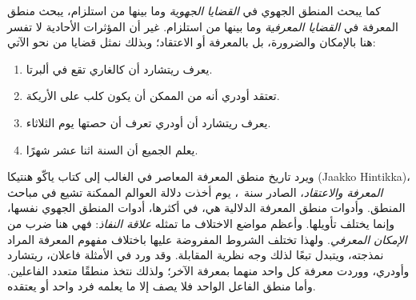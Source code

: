 \documentclass[../../../include/open-logic-section]{subfiles}
\begin{document}


كما يبحث المنطق الجهوي في \emph{القضايا الجهوية} وما بينها من استلزام، يبحث
منطق المعرفة في \emph{القضايا المعرفية} وما بينها من استلزام. غير أن
المؤثرات الأحادية لا تفسر هنا بالإمكان والضرورة، بل بالمعرفة أو الاعتقاد؛
وبذلك نمثل قضايا من نحو الآتي:

\begin{enumerate}
\item يعرف ريتشارد أن كالغاري تقع في ألبرتا.
\item تعتقد أودري أنه من الممكن أن يكون كلب على الأريكة.
\item يعرف ريتشارد أن أودري تعرف أن حصتها يوم الثلاثاء.
\item يعلم الجميع أن السنة اثنا عشر شهرًا.
\end{enumerate}
ويرد تاريخ منطق المعرفة المعاصر في الغالب إلى كتاب ياكّو هنتيكا
(Jaakko Hintikka)،
\emph{المعرفة والاعتقاد}، الصادر سنة~، يوم أخذت دلالة العوالم الممكنة
تشيع في مباحث المنطق. وأدوات منطق المعرفة الدلالية هي، في أكثرها، أدوات
المنطق الجهوي نفسها، وإنما يختلف تأويلها. وأعظم مواضع الاختلاف ما تمثله
\emph{علاقة النفاذ}: فهي هنا ضرب من \emph{الإمكان المعرفي}. ولهذا تختلف
الشروط المفروضة عليها باختلاف مفهوم المعرفة المراد نمذجته، ويتبدل تبعًا
لذلك وجه نظرية المقابلة. وقد ورد في الأمثلة فاعلان، ريتشارد وأودري، ووردت
معرفة كل واحد منهما بمعرفة الآخر؛ ولذلك نتخذ منطقًا متعدد الفاعلين. وأما
منطق الفاعل الواحد فلا يصف إلا ما يعلمه فرد واحد أو يعتقده.
\end{document}
